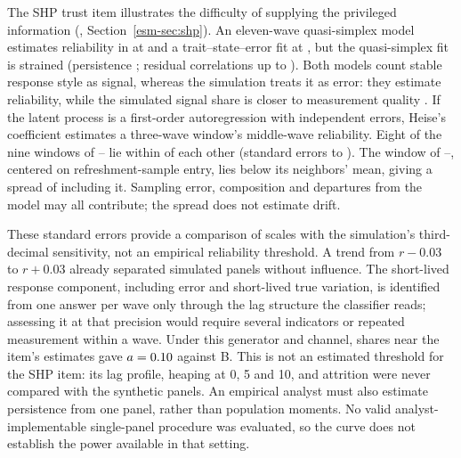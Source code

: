 The SHP trust item illustrates the difficulty of supplying the privileged information (\esmresource, Section~\ref{esm-sec:shp}). An eleven-wave quasi-simplex model estimates reliability in  at  and a trait--state--error fit at , but the quasi-simplex fit is strained (persistence ; residual correlations up to ). Both models count stable response style as signal, whereas the simulation treats it as error: they estimate reliability, while the simulated signal share is closer to measurement quality \cite{saris2014}. If the latent process is a first-order autoregression with independent errors, Heise's coefficient \cite{heise1969} estimates a three-wave window's middle-wave reliability. Eight of the nine windows of -- lie within  of each other (standard errors  to ). The window of --, centered on refreshment-sample entry, lies  below its neighbors' mean, giving a spread of  including it. Sampling error, composition and departures from the model may all contribute; the spread does not estimate drift.

These standard errors provide a comparison of scales with the simulation's third-decimal sensitivity, not an empirical reliability threshold. A trend from $r-0.03$ to $r+0.03$ already separated simulated panels without influence. The short-lived response component, including error and short-lived true variation, is identified from one answer per wave only through the lag structure the classifier reads; assessing it at that precision would require several indicators or repeated measurement within a wave. Under this generator and channel, shares near the item's estimates gave $a=\resultnum{j.b.r065.first.point}{0.10}$ against B. This is not an estimated threshold for the SHP item: its lag profile, heaping at 0, 5 and 10, and attrition were never compared with the synthetic panels. An empirical analyst must also estimate persistence from one panel, rather than population moments. No valid analyst-implementable single-panel procedure was evaluated, so the curve does not establish the power available in that setting.

